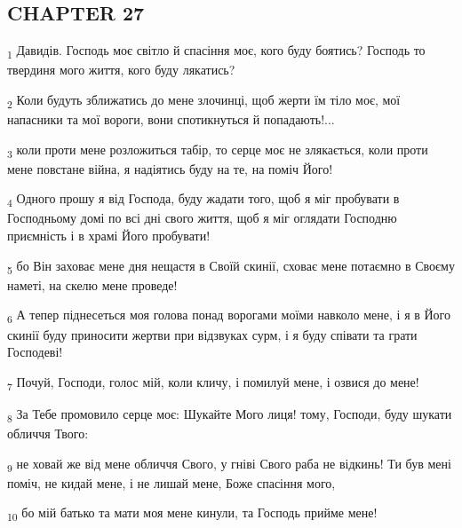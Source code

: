 \subsection{CHAPTER 27}
\begin{tcolorbox}
\textsubscript{1} Давидів. Господь моє світло й спасіння моє, кого буду боятись? Господь то твердиня мого життя, кого буду лякатись?
\end{tcolorbox}
\begin{tcolorbox}
\textsubscript{2} Коли будуть зближатись до мене злочинці, щоб жерти їм тіло моє, мої напасники та мої вороги, вони спотикнуться й попадають!...
\end{tcolorbox}
\begin{tcolorbox}
\textsubscript{3} коли проти мене розложиться табір, то серце моє не злякається, коли проти мене повстане війна, я надіятись буду на те, на поміч Його!
\end{tcolorbox}
\begin{tcolorbox}
\textsubscript{4} Одного прошу я від Господа, буду жадати того, щоб я міг пробувати в Господньому домі по всі дні свого життя, щоб я міг оглядати Господню приємність і в храмі Його пробувати!
\end{tcolorbox}
\begin{tcolorbox}
\textsubscript{5} бо Він заховає мене дня нещастя в Своїй скинії, сховає мене потаємно в Своєму наметі, на скелю мене проведе!
\end{tcolorbox}
\begin{tcolorbox}
\textsubscript{6} А тепер піднесеться моя голова понад ворогами моїми навколо мене, і я в Його скинії буду приносити жертви при відзвуках сурм, і я буду співати та грати Господеві!
\end{tcolorbox}
\begin{tcolorbox}
\textsubscript{7} Почуй, Господи, голос мій, коли кличу, і помилуй мене, і озвися до мене!
\end{tcolorbox}
\begin{tcolorbox}
\textsubscript{8} За Тебе промовило серце моє: Шукайте Мого лиця! тому, Господи, буду шукати обличчя Твого:
\end{tcolorbox}
\begin{tcolorbox}
\textsubscript{9} не ховай же від мене обличчя Свого, у гніві Свого раба не відкинь! Ти був мені поміч, не кидай мене, і не лишай мене, Боже спасіння мого,
\end{tcolorbox}
\begin{tcolorbox}
\textsubscript{10} бо мій батько та мати моя мене кинули, та Господь прийме мене!
\end{tcolorbox}
